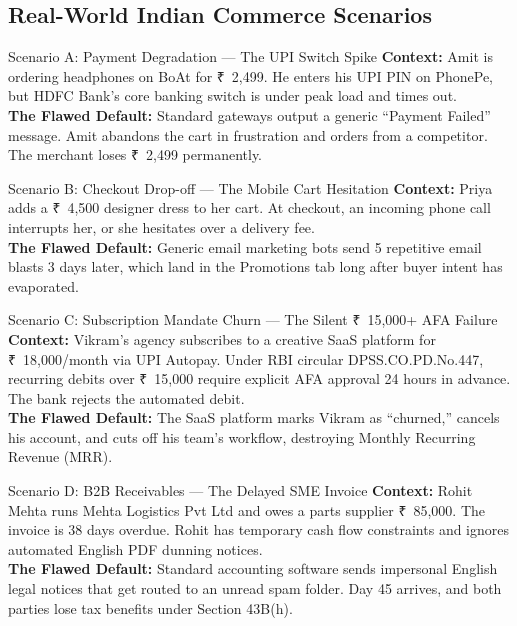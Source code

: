 \documentclass[11pt, a4paper]{article}
\newcommand{\INR}{{\rupeefont ₹}}
\begin{document}
\newpage
\subsection{Real-World Indian Commerce Scenarios}

\begin{scenariobox}{Scenario A: Payment Degradation --- The UPI Switch Spike}
\textbf{Context:} Amit is ordering headphones on BoAt for \INR~2,499. He enters his UPI PIN on PhonePe, but HDFC Bank's core banking switch is under peak load and times out.\\
\textbf{The Flawed Default:} Standard gateways output a generic ``Payment Failed'' message. Amit abandons the cart in frustration and orders from a competitor. The merchant loses \INR~2,499 permanently.
\end{scenariobox}

\begin{scenariobox}{Scenario B: Checkout Drop-off --- The Mobile Cart Hesitation}
\textbf{Context:} Priya adds a \INR~4,500 designer dress to her cart. At checkout, an incoming phone call interrupts her, or she hesitates over a delivery fee.\\
\textbf{The Flawed Default:} Generic email marketing bots send 5 repetitive email blasts 3 days later, which land in the Promotions tab long after buyer intent has evaporated.
\end{scenariobox}

\begin{scenariobox}{Scenario C: Subscription Mandate Churn --- The Silent \INR~15,000+ AFA Failure}
\textbf{Context:} Vikram's agency subscribes to a creative SaaS platform for \INR~18,000/month via UPI Autopay. Under RBI circular DPSS.CO.PD.No.447, recurring debits over \INR~15,000 require explicit AFA approval 24 hours in advance. The bank rejects the automated debit.\\
\textbf{The Flawed Default:} The SaaS platform marks Vikram as ``churned,'' cancels his account, and cuts off his team's workflow, destroying Monthly Recurring Revenue (MRR).
\end{scenariobox}

\begin{scenariobox}{Scenario D: B2B Receivables --- The Delayed SME Invoice}
\textbf{Context:} Rohit Mehta runs Mehta Logistics Pvt Ltd and owes a parts supplier \INR~85,000. The invoice is 38 days overdue. Rohit has temporary cash flow constraints and ignores automated English PDF dunning notices.\\
\textbf{The Flawed Default:} Standard accounting software sends impersonal English legal notices that get routed to an unread spam folder. Day 45 arrives, and both parties lose tax benefits under Section 43B(h).
\end{scenariobox}
\end{document}
